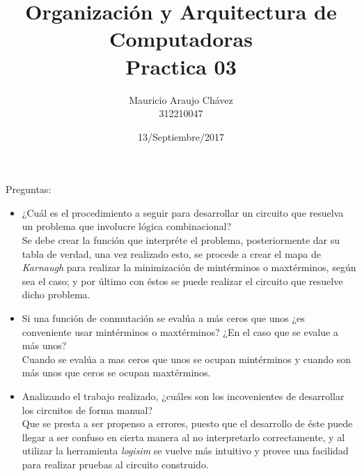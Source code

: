 \documentclass[a4paper,11pt]{article}
\title{Organización y Arquitectura de Computadoras\\Practica 03}
\author{Mauricio Araujo Chávez\\312210047}
\date{13/Septiembre/2017}
\begin{document}
\maketitle

Preguntas: 

\begin{itemize}
  \item ¿Cuál es el procedimiento a seguir para desarrollar un circuito que resuelva un problema que involucre lógica combinacional? \\ Se debe crear la función que interpréte el problema, posteriormente dar su tabla de verdad, una vez realizado esto, se procede a crear el mapa de \textit{Karnaugh} para realizar la minimización de mintérminos o maxtérminos, según sea el caso; y por último con éstos se puede realizar el circuito que resuelve dicho problema.
\end{itemize}
\begin{itemize}
  \item Si una función de conmutación se evalúa a más ceros que unos ¿es conveniente usar mintérminos o maxtérminos? ¿En el caso que se evalue a más unos? \\ Cuando se evalúa a mas ceros que unos se ocupan mintérminos y cuando son más unos que ceros se ocupan maxtérminos.
\end{itemize}
\begin{itemize}
  \item Analizando el trabajo realizado, ¿cuáles son los incovenientes de desarrollar los circuitos de forma manual? \\ Que se presta a ser propenso a errores, puesto que el desarrollo de éste puede llegar a ser confuso en cierta manera al no interpretarlo correctamente, y al utilizar la herramienta \textit{logisim} se vuelve más intuitivo y provee una facilidad para realizar pruebas al circuito construido.
\end{itemize}
\end{document}
